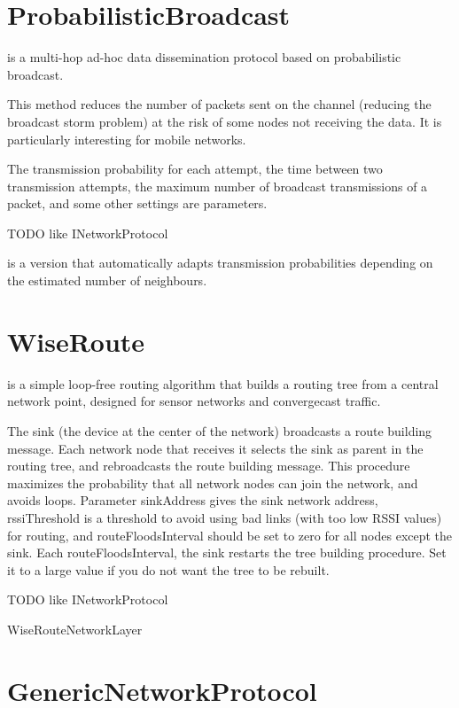 \section{ProbabilisticBroadcast}

 is a multi-hop ad-hoc data dissemination 
protocol based on probabilistic broadcast.

This method reduces the number of packets sent on the channel (reducing the
broadcast storm problem) at the risk of some nodes not receiving the data.
It is particularly interesting for mobile networks.

The transmission probability for each attempt, the time between two transmission
attempts, the maximum number of broadcast transmissions of a packet, and
some other settings are parameters.

TODO like INetworkProtocol

 is a version that automatically 
adapts transmission probabilities depending on the estimated number of 
neighbours.

\section{WiseRoute}

 is a simple loop-free routing algorithm that
builds a routing tree from a central network point, designed
for sensor networks and convergecast traffic.

The sink (the device at the center of the network) broadcasts
a route building message. Each network node that receives it
selects the sink as parent in the routing tree, and rebroadcasts
the route building message. This procedure maximizes the probability
that all network nodes can join the network, and avoids loops.
Parameter sinkAddress gives the sink network address,
rssiThreshold is a threshold to avoid using bad links (with too low
RSSI values) for routing, and routeFloodsInterval should be set to
zero for all nodes except the sink. Each routeFloodsInterval, the
sink restarts the tree building procedure. Set it to a large value
if you do not want the tree to be rebuilt.

TODO like INetworkProtocol

WiseRouteNetworkLayer

\section{GenericNetworkProtocol}

